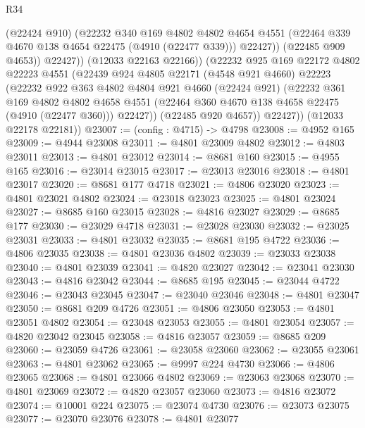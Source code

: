 \begin{lexlean}{R34}
\begin{coremodule}
                  (@22424 @910)
                  (@22232
                    @340
                    @169
                    @4802
                    @4802
                    @4654
                    @4551
                    (@22464 @339 @4670 @138 @4654 @22475 (@4910 (@22477 @339)))
                    @22427))
                (@22485 @909 @4653))
              @22427))
          (@12033 @22163 @22166))
        (@22232
          @925
          @169
          @22172
          @4802
          @22223
          @4551
          (@22439
            @924
            @4805
            @22171
            (@4548 @921 @4660)
            @22223
            (@22232
              @922
              @363
              @4802
              @4804
              @921
              @4660
              (@22424 @921)
              (@22232
                @361
                @169
                @4802
                @4802
                @4658
                @4551
                (@22464 @360 @4670 @138 @4658 @22475 (@4910 (@22477 @360)))
                @22427))
            (@22485 @920 @4657))
          @22427))
      (@12033 @22178 @22181))
@23007 := (config : @4715) -> @4798
@23008 := @4952 @165
@23009 := @4944 @23008
@23011 := @4801 @23009 @4802
@23012 := @4803 @23011
@23013 := @4801 @23012
@23014 := @8681 @160
@23015 := @4955 @165
@23016 := @23014 @23015
@23017 := @23013 @23016
@23018 := @4801 @23017
@23020 := @8681 @177 @4718
@23021 := @4806 @23020
@23023 := @4801 @23021 @4802
@23024 := @23018 @23023
@23025 := @4801 @23024
@23027 := @8685 @160 @23015
@23028 := @4816 @23027
@23029 := @8685 @177
@23030 := @23029 @4718
@23031 := @23028 @23030
@23032 := @23025 @23031
@23033 := @4801 @23032
@23035 := @8681 @195 @4722
@23036 := @4806 @23035
@23038 := @4801 @23036 @4802
@23039 := @23033 @23038
@23040 := @4801 @23039
@23041 := @4820 @23027
@23042 := @23041 @23030
@23043 := @4816 @23042
@23044 := @8685 @195
@23045 := @23044 @4722
@23046 := @23043 @23045
@23047 := @23040 @23046
@23048 := @4801 @23047
@23050 := @8681 @209 @4726
@23051 := @4806 @23050
@23053 := @4801 @23051 @4802
@23054 := @23048 @23053
@23055 := @4801 @23054
@23057 := @4820 @23042 @23045
@23058 := @4816 @23057
@23059 := @8685 @209
@23060 := @23059 @4726
@23061 := @23058 @23060
@23062 := @23055 @23061
@23063 := @4801 @23062
@23065 := @9997 @224 @4730
@23066 := @4806 @23065
@23068 := @4801 @23066 @4802
@23069 := @23063 @23068
@23070 := @4801 @23069
@23072 := @4820 @23057 @23060
@23073 := @4816 @23072
@23074 := @10001 @224
@23075 := @23074 @4730
@23076 := @23073 @23075
@23077 := @23070 @23076
@23078 := @4801 @23077

\end{coremodule}
\end{lexlean}
